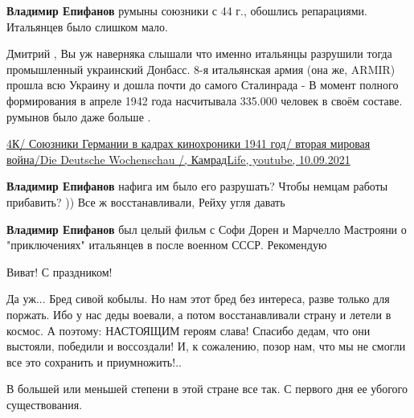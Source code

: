 \begin{itemize}
\begin{itemize} %
\textbf{Владимир Епифанов} румыны союзники с 44 г., обошлись репарациями. Итальянцев было слишком мало.


Дмитрий , Вы уж наверняка слышали что именно итальянцы разрушили тогда
промышленный украинский Донбасс. 8-я итальянская армия (она же, ARMIR) прошла
всю Украину и дошла почти до самого Сталинрада - В момент полного формирования
в апреле 1942 года насчитывала 335.000 человек в своём составе. румынов было
даже больше .


\href{https://youtu.be/PaqfEcmpLYs}{%
4К/ Союзники Германии в кадрах кинохроники 1941 год/ вторая мировая война/Die Deutsche Wochenschau /, %
КамрадLife, youtube, 10.09.2021%
}

\textbf{Владимир Епифанов} нафига им было его разрушать? Чтобы немцам работы прибавить? )) Все ж восстанавливали, Рейху угля давать

\textbf{Владимир Епифанов} был целый фильм с Софи Дорен и Марчелло Мастрояни о "приключениях" итальянцев в после военном СССР. Рекомендую


\end{itemize} %

Виват! С праздником!

Да уж... Бред сивой кобылы.
Но нам этот бред без интереса, разве только для поржать. Ибо у нас деды воевали, а потом восстанавливали страну и летели в космос.
А поэтому: НАСТОЯЩИМ героям слава!
Спасибо дедам, что они выстояли, победили и воссоздали!
И, к сожалению, позор нам, что мы не смогли все это сохранить и приумножить!..

В большей или меньшей степени в этой стране все так. С первого дня ее убогого существования.

\end{itemize} %
